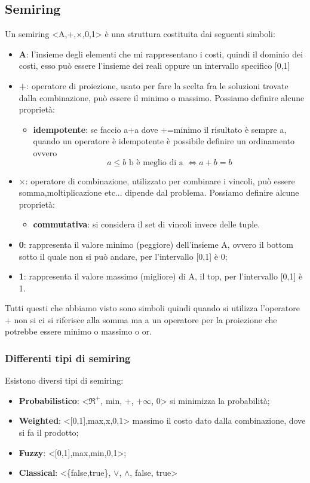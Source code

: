 \subsection{Semiring}
Un semiring <A,+,$\times$,0,1> è una struttura costituita dai seguenti simboli:
\begin{itemize}
    \item \textbf{A}: l'insieme degli elementi che mi rappresentano i costi, quindi il dominio dei costi, esso può essere l'insieme dei reali oppure un intervallo specifico [0,1]
    \item \textbf{+}: operatore di proiezione, usato per fare la scelta fra le soluzioni trovate dalla combinazione, può essere il minimo o massimo. Possiamo definire alcune proprietà:
    \begin{itemize}
        \item \textbf{idempotente}: se faccio a+a dove +=minimo il risultato è sempre a, quando un operatore è idempotente è possibile definire un ordinamento ovvero 
        \[ a \leq b \text{ b è meglio di a } \iff a+b=b\]
    \end{itemize}
    \item \textbf{$\times$}: operatore di combinazione, utilizzato per combinare i vincoli, può essere somma,moltiplicazione etc... dipende dal problema. Possiamo definire alcune proprietà:
    \begin{itemize}
        \item \textbf{commutativa}: si considera il set di vincoli invece delle tuple.
    \end{itemize}
    \item \textbf{0}: rappresenta il valore minimo (peggiore) dell'insieme A, ovvero il bottom sotto il quale non si può andare, per l'intervallo [0,1] è 0;
    \item \textbf{1}: rappresenta il valore massimo (migliore) di A, il top, per l'intervallo [0,1] è 1. 
\end{itemize}
Tutti questi che abbiamo visto sono simboli quindi quando si utilizza l'operatore + non si ci si riferisce alla somma ma a un operatore per la proiezione che potrebbe essere minimo o massimo o or.

\subsubsection{Differenti tipi di semiring}
Esistono diversi tipi di semiring:
\begin{itemize}
    \item \textbf{Probabilistico}: <$\Re^+$, min, +, $+\infty$, 0> si minimizza la probabilità;
    \item \textbf{Weighted}: <[0,1],max,x,0,1> massimo il costo dato dalla combinazione, dove si fa il prodotto;
    \item \textbf{Fuzzy}: <[0,1],max,min,0,1>;
    \item \textbf{Classical}: <\{false,true\}, $\vee$, $ \wedge$, false, true>
\end{itemize}

